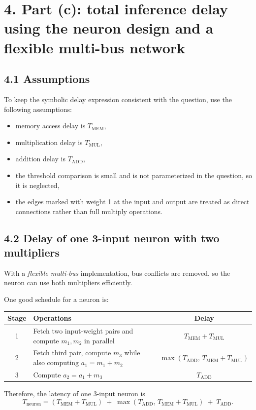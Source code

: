 \documentclass[11pt,a4paper]{article}
\begin{document}
\clearpage
\section*{4. Part (c): total inference delay using the neuron design and a flexible multi-bus network}
\subsection*{4.1 Assumptions}
To keep the symbolic delay expression consistent with the question, use the following assumptions:
\begin{itemize}
  \item memory access delay is $T_{\text{MEM}}$,
  \item multiplication delay is $T_{\text{MUL}}$,
  \item addition delay is $T_{\text{ADD}}$,
  \item the threshold comparison is small and is not parameterized in the question, so it is neglected,
  \item the edges marked with weight 1 at the input and output are treated as direct connections rather than full multiply operations.
\end{itemize}

\subsection*{4.2 Delay of one 3-input neuron with two multipliers}
With a \emph{flexible multi-bus} implementation, bus conflicts are removed, so the neuron can use both multipliers efficiently.

One good schedule for a neuron is:
\begin{center}
\begin{tabular}{clc}
\toprule
Stage & Operations & Delay \\
\midrule
1 & Fetch two input-weight pairs and compute $m_1,m_2$ in parallel & $T_{\text{MEM}}+T_{\text{MUL}}$ \\
2 & Fetch third pair, compute $m_3$ while also computing $a_1=m_1+m_2$ & $\max(T_{\text{ADD}},\,T_{\text{MEM}}+T_{\text{MUL}})$ \\
3 & Compute $a_2=a_1+m_3$ & $T_{\text{ADD}}$ \\
\bottomrule
\end{tabular}
\end{center}

Therefore, the latency of one 3-input neuron is
\[
\boxed{
T_{\text{neuron}}
=
(T_{\text{MEM}}+T_{\text{MUL}})
\;+\;
\max(T_{\text{ADD}},\,T_{\text{MEM}}+T_{\text{MUL}})
\;+\;
T_{\text{ADD}}.
}
\]
\end{document}
